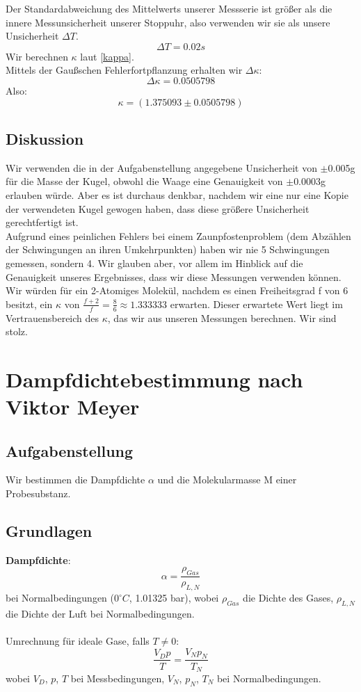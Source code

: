 \documentclass{article}
\begin{document}
Der Standardabweichung des Mittelwerts unserer Messserie ist größer als die innere Messunsicherheit unserer Stoppuhr, also verwenden wir sie als unsere Unsicherheit $\Delta T$.
$$\Delta T=0.02s$$
Wir  berechnen $\kappa$ laut \ref{kappa}. \\
Mittels der Gaußschen Fehlerfortpflanzung erhalten wir $\Delta\kappa$:
$$\Delta\kappa=0.0505798$$
Also:
$$\boxed{\kappa=(1.375093 \pm 0.0505798)} $$

\subsection{Diskussion}
Wir verwenden die in der Aufgabenstellung angegebene Unsicherheit von $\pm$0.005g für die Masse der Kugel, obwohl die Waage eine Genauigkeit von $\pm$0.0003g erlauben würde. Aber es ist durchaus denkbar, nachdem wir eine nur eine Kopie der verwendeten Kugel gewogen haben, dass diese größere Unsicherheit gerechtfertigt ist. \\ 
Aufgrund eines peinlichen Fehlers bei einem Zaunpfostenproblem (dem Abzählen der Schwingungen an ihren Umkehrpunkten) haben wir nie 5 Schwingungen gemessen, sondern 4. Wir glauben aber, vor allem im Hinblick auf die Genauigkeit unseres Ergebnisses, dass wir diese Messungen verwenden können. \\ 
Wir würden für ein 2-Atomiges Molekül, nachdem es einen Freiheitsgrad f von 6 besitzt, ein $\kappa$ von $\frac{f+2}{f}=\frac{8}{6}\approx1.333333$ erwarten. Dieser erwartete Wert liegt im Vertrauensbereich des $\kappa$, das wir aus unseren Messungen berechnen. Wir sind stolz.
\newpage
\section{Dampfdichtebestimmung nach Viktor Meyer}
\subsection{Aufgabenstellung}
Wir bestimmen die Dampfdichte $\alpha$ und die Molekularmasse M einer Probesubstanz. 
\subsection{Grundlagen}
\textbf{Dampfdichte}: 
\begin{equation}
\label{dampfdichte_norm}
\alpha=\frac{\rho_{Gas}}{\rho_{L,N}}
\end{equation}
bei Normalbedingungen ($0^\circ C$, 1.01325 bar), wobei $\rho_{Gas}$ die Dichte des Gases, $\rho_{L,N}$ die Dichte der Luft bei Normalbedingungen.\\
\\
Umrechnung für ideale Gase, falls $T\neq 0$:
\begin{equation}
\frac{V_Dp}{T}=\frac{V_Np_N}{T_N}
\end{equation}
wobei $V_D$, $p$, $T$ bei Messbedingungen, $V_N$, $p_N$, $T_N$ bei Normalbedingungen.
\end{document}
